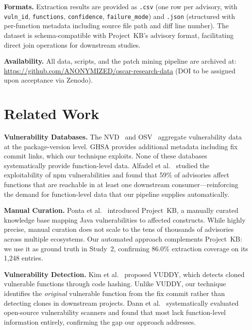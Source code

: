 \documentclass[sigconf,nonacm]{acmart}
\begin{document}
\textbf{Formats.}
Extraction results are provided as \texttt{.csv} (one row per advisory,
with \texttt{vuln\_id}, \texttt{functions}, \texttt{confidence},
\texttt{failure\_mode}) and \texttt{.json} (structured with per-function
metadata including source file path and diff line number).
The dataset is schema-compatible with Project~KB's advisory format,
facilitating direct join operations for downstream studies.

\textbf{Availability.}
All data, scripts, and the patch mining pipeline are archived at:
\url{https://github.com/ANONYMIZED/oscar-research-data}
(DOI to be assigned upon acceptance via Zenodo).

\section{Related Work}
\label{sec:related}

\textbf{Vulnerability Databases.}
The NVD~\cite{nvd} and OSV~\cite{osv} aggregate vulnerability data at the
package-version level.
GHSA provides additional metadata including fix commit links, which our
technique exploits.
None of these databases systematically provide function-level data.
Alfadel et al.~\cite{alfadel2022exploitability} studied the exploitability
of npm vulnerabilities and found that 59\% of advisories affect functions
that are reachable in at least one downstream consumer---reinforcing the
demand for function-level data that our pipeline supplies automatically.

\textbf{Manual Curation.}
Ponta et al.~\cite{ponta2019projectkb} introduced Project~KB, a manually
curated knowledge base mapping Java vulnerabilities to affected constructs.
While highly precise, manual curation does not scale to the tens of
thousands of advisories across multiple ecosystems.
Our automated approach complements Project~KB: we use it as ground truth
in Study~2, confirming 86.0\% extraction coverage on its 1{,}248 entries.

\textbf{Vulnerability Detection.}
Kim et al.~\cite{kim2017vuddy} proposed VUDDY, which detects cloned
vulnerable functions through code hashing.
Unlike VUDDY, our technique identifies the \emph{original} vulnerable
function from the fix commit rather than detecting clones in downstream
projects.
Dann et al.~\cite{dann2021identifying} systematically evaluated
open-source vulnerability scanners and found that most lack function-level
information entirely, confirming the gap our approach addresses.
\end{document}
